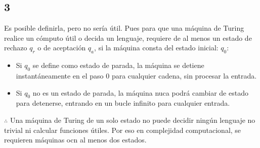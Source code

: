 \subsection{3}
Es posible definirla, pero no sería útil. Pues para que una máquina de Turing realice un cómputo útil o decida un lenguaje, requiere de al menos un estado de rechazo $q_r$ o de aceptación $q_a$, si la máquina consta del estado inicial: $q_0$:
\begin{itemize}
    \item Si $q_0$ se define como estado de parada, la máquina se detiene instantáneamente en el paso $0$ para cualquier cadena, sin procesar la entrada. 
    \item Si $q_0$ no es un estado de parada, la máquina nuca podrá cambiar de estado para detenerse, entrando en un bucle infinito para cualquier entrada.
\end{itemize}
$\therefore$ Una máquina de Turing de un solo estado no puede decidir ningún lenguaje no trivial ni calcular funciones útiles. Por eso en complejidad computacional, se requieren máquinas ocn al menos dos estados.
